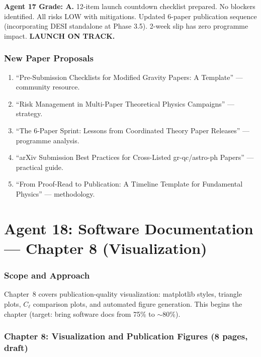 \documentclass[11pt,a4paper]{article}
\begin{document}
\begin{tcolorbox}[colback=green!5!white,colframe=green!40!black]
\textbf{Agent 17 Grade: A.} 12-item launch countdown checklist prepared. No blockers identified. All risks LOW with mitigations. Updated 6-paper publication sequence (incorporating DESI standalone at Phase 3.5). 2-week slip has zero programme impact. \textbf{LAUNCH ON TRACK.}
\end{tcolorbox}

\section{New Paper Proposals}

\begin{enumerate}
\item ``Pre-Submission Checklists for Modified Gravity Papers: A Template'' --- community resource.
\item ``Risk Management in Multi-Paper Theoretical Physics Campaigns'' --- strategy.
\item ``The 6-Paper Sprint: Lessons from Coordinated Theory Paper Releases'' --- programme analysis.
\item ``arXiv Submission Best Practices for Cross-Listed gr-qc/astro-ph Papers'' --- practical guide.
\item ``From Proof-Read to Publication: A Timeline Template for Fundamental Physics'' --- methodology.
\end{enumerate}


\part{Agent 18: Software Documentation --- Chapter 8 (Visualization)}
\label{part:software-ch8}

\section{Scope and Approach}

Chapter~8 covers publication-quality visualization: matplotlib styles, triangle plots, $C_\ell$ comparison plots, and automated figure generation. This begins the chapter (target: bring software docs from 75\% to $\sim$80\%).

\section{Chapter 8: Visualization and Publication Figures (8 pages, draft)}
\end{document}
